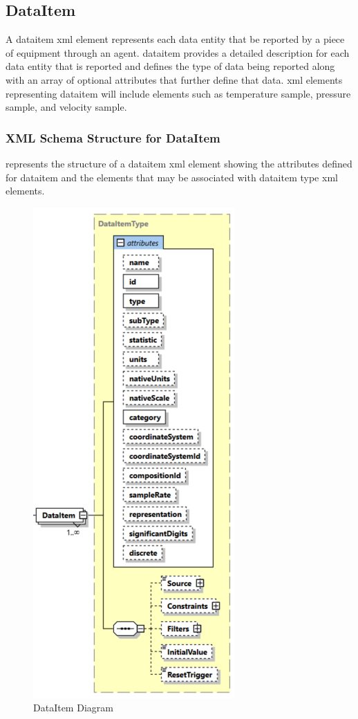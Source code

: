 

\subsection{DataItem}

A \gls{dataitem} \gls{xml} element represents each \gls{data entity} that \may be reported by a piece of equipment through an \gls{agent}.   \gls{dataitem} provides a detailed description for each \gls{data entity} that is reported and defines the type of data being reported along with an array of optional attributes that further define that data.  \gls{xml} elements representing \gls{dataitem} will include elements such as \gls{temperature sample}, \gls{pressure sample}, and \gls{velocity sample}. 



\subsubsection{XML Schema Structure for DataItem}

 represents the structure of a \gls{dataitem} \gls{xml} element showing the attributes defined for \gls{dataitem} and the elements that may be associated with \gls{dataitem} type \gls{xml} elements.

\begin{figure}[ht]
  \centering
  \includegraphics[width=.45\textwidth]{figures/dataitem-schema-diagram.png}
  \caption{DataItem Diagram}
  \label{fig:dataitem-schema-diagram}
\end{figure}
\FloatBarrier

